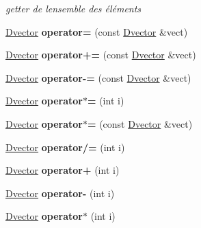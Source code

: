 \begin{DoxyCompactItemize}
\begin{DoxyCompactList}\small\item\em getter de l\textquotesingle{}ensemble des éléments \end{DoxyCompactList}\item 
\mbox{\label{class_dvector_a9c72bc1fb55c36844d55b996127e7be7}} 
\hyperlink{class_dvector}{Dvector} {\bfseries operator=} (const \hyperlink{class_dvector}{Dvector} \&vect)
\item 
\mbox{\label{class_dvector_a75c5523da365463f4efa812a44596409}} 
\hyperlink{class_dvector}{Dvector} {\bfseries operator+=} (const \hyperlink{class_dvector}{Dvector} \&vect)
\item 
\mbox{\label{class_dvector_a472907173bf8eaf0aaa0ff9bde8f125e}} 
\hyperlink{class_dvector}{Dvector} {\bfseries operator-\/=} (const \hyperlink{class_dvector}{Dvector} \&vect)
\item 
\mbox{\label{class_dvector_af31badc85a41de4257f0b2a870c5cc84}} 
\hyperlink{class_dvector}{Dvector} {\bfseries operator$\ast$=} (int i)
\item 
\mbox{\label{class_dvector_ad4ead0c93b44fc1d1b31e58d4f7e0a78}} 
\hyperlink{class_dvector}{Dvector} {\bfseries operator$\ast$=} (const \hyperlink{class_dvector}{Dvector} \&vect)
\item 
\mbox{\label{class_dvector_a184af91c3a82d4225382e3bc2f21f21c}} 
\hyperlink{class_dvector}{Dvector} {\bfseries operator/=} (int i)
\item 
\mbox{\label{class_dvector_aabff73704ce72471069bc304bd6e6ca5}} 
\hyperlink{class_dvector}{Dvector} {\bfseries operator+} (int i)
\item 
\mbox{\label{class_dvector_a801899c54a142444de7156e718ef559b}} 
\hyperlink{class_dvector}{Dvector} {\bfseries operator-\/} (int i)
\item 
\mbox{\label{class_dvector_a2bd2d56073f1dfe48c8387537c51c882}} 
\hyperlink{class_dvector}{Dvector} {\bfseries operator$\ast$} (int i)
\item 

\end{DoxyCompactItemize}
